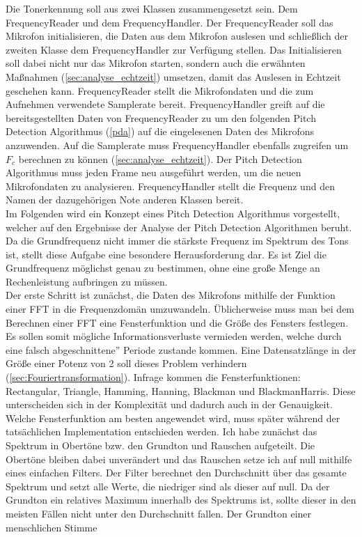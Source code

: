 Die Tonerkennung soll aus zwei Klassen zusammengesetzt sein. Dem FrequencyReader und dem FrequencyHandler. Der FrequencyReader soll das Mikrofon initialisieren, die Daten aus dem Mikrofon auslesen und schließlich der zweiten Klasse dem FrequencyHandler zur Verfügung stellen. Das Initialisieren soll dabei nicht nur das Mikrofon starten, sondern auch die erwähnten Maßnahmen (\ref{sec:analyse_echtzeit}) umsetzen, damit das Auslesen in Echtzeit geschehen kann. FrequencyReader stellt die Mikrofondaten und die zum Aufnehmen verwendete Samplerate bereit. FrequencyHandler greift auf die bereitsgestellten Daten von FrequencyReader zu um den folgenden Pitch Detection Algorithmus (\ref{pda}) auf die eingelesenen Daten des Mikrofons anzuwenden. Auf die Samplerate muss FrequencyHandler ebenfalls zugreifen um $F_c$ berechnen zu können (\ref{sec:analyse_echtzeit}). Der Pitch Detection Algorithmus muss jeden Frame neu ausgeführt werden, um die neuen Mikrofondaten zu analysieren. FrequencyHandler stellt die Frequenz und den Namen der dazugehörigen Note anderen Klassen bereit.\\
Im Folgenden wird ein Konzept eines Pitch Detection Algorithmus vorgestellt, welcher auf den Ergebnisse der Analyse der Pitch Detection Algorithmen beruht. Da die Grundfrequenz nicht immer die stärkste Frequenz im Spektrum des Tons ist, stellt diese Aufgabe eine besondere Herausforderung dar. Es ist Ziel die Grundfrequenz möglichst genau zu bestimmen, ohne eine große Menge an Rechenleistung aufbringen zu müssen. \\
Der erste Schritt ist zunächst, die Daten des Mikrofons mithilfe der Funktion einer FFT in die Frequenzdomän umzuwandeln. Üblicherweise muss man bei dem Berechnen einer FFT eine Fensterfunktion und die Größe des Fensters festlegen. Es sollen somit mögliche Informationsverluste vermieden werden, welche durch eine falsch \glqq abgeschnittene'' Periode zustande kommen. Eine Datensatzlänge in der Größe einer Potenz von 2 soll dieses Problem verhindern (\ref{sec:Fouriertransformation}). Infrage kommen die Fensterfunktionen: Rectangular, Triangle, Hamming, Hanning, Blackman und BlackmanHarris. Diese unterscheiden sich in der Komplexität und dadurch auch in der Genauigkeit. Welche Fensterfunktion am besten angewendet wird, muss später während der tatsächlichen Implementation entschieden werden.
Ich habe zunächst das Spektrum in Obertöne bzw. den Grundton und Rauschen aufgeteilt. Die Obertöne bleiben dabei unverändert und das Rauschen setze ich auf null mithilfe eines einfachen Filters. Der Filter berechnet den Durchschnitt über das gesamte Spektrum und setzt alle Werte, die niedriger sind als dieser auf null. Da der Grundton ein relatives Maximum innerhalb des Spektrums ist, sollte dieser in den meisten Fällen nicht unter den Durchschnitt fallen. Der Grundton einer menschlichen Stimme 
